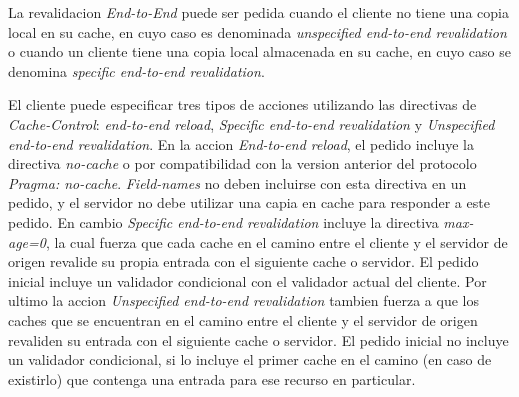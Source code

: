 La revalidacion \emph{End-to-End} puede ser pedida cuando el cliente no tiene una copia local en su cache, en cuyo caso es denominada \emph{unspecified end-to-end revalidation}
o cuando un cliente tiene una copia local almacenada en su cache, en cuyo caso se denomina \emph{specific end-to-end revalidation}.

El cliente puede especificar tres tipos de acciones utilizando las directivas de \emph{Cache-Control}: \emph{end-to-end reload}, \emph{Specific end-to-end revalidation} y
\emph{Unspecified end-to-end revalidation}.
En la accion \emph{End-to-end reload}, el pedido incluye la directiva \emph{no-cache} o por compatibilidad con la version anterior del protocolo \emph{Pragma: no-cache}.
\emph{Field-names} no deben incluirse con esta directiva en un pedido, y el servidor no debe utilizar una capia en cache para responder a este pedido.
En cambio \emph{Specific end-to-end revalidation} incluye la directiva \emph{max-age=0}, la cual fuerza que cada cache en el camino entre el cliente y el servidor de origen
revalide su propia entrada con el siguiente cache o servidor. El pedido inicial incluye un validador condicional con el validador actual del cliente.
Por ultimo la accion \emph{Unspecified end-to-end revalidation} tambien fuerza a que los caches que se encuentran en el camino entre el cliente y el servidor de origen
revaliden su entrada con el siguiente cache o servidor. El pedido inicial no incluye un validador condicional, si lo incluye el primer cache en el camino (en caso de existirlo)
que contenga una entrada para ese recurso en particular.


